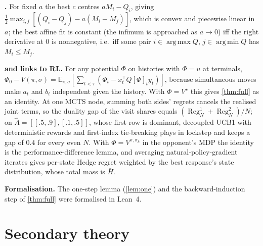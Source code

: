 \documentclass[10pt]{article}
\theoremstyle{plain}
\theoremstyle{definition}
\theoremstyle{remark}
\newcommand{\E}{\mathbb{E}}
\newcommand{\Hbar}{\bar H}
\newcommand{\Ahat}{\hat A}
\newcommand{\Vstar}{V^\star}
\DeclareMathOperator{\Reg}{Reg}
\DeclareMathOperator*{\argmin}{arg\,min}
\DeclareMathOperator*{\argmax}{arg\,max}
\begin{document}
\textbf{.} For fixed $a$ the best $c$ centres $aM_i-Q_i$, giving $\frac12\max_{i,j}[(Q_i-Q_j)-a(M_i-M_j)]$, which is convex and piecewise linear in $a$; the best affine fit is constant (the infimum is approached as $a\to0$) iff the right derivative at 0 is nonnegative, i.e.\ iff some pair $i\in\argmax Q$, $j\in\argmin Q$ has $M_i\le M_j$.

\textbf{ and links to RL.} For any potential $\Phi$ on histories with $\Phi=u$ at terminals, $\Phi_0-V(\pi,\sigma)=\E_{\pi,\sigma}[\sum_{t<\tau}(\Phi_t-x_t^\top Q[\Phi]_ty_t)]$, because simultaneous moves make $a_t$ and $b_t$ independent given the history. With $\Phi=\Vstar$ this gives \cref{thm:full} as an identity. At one MCTS node, summing both sides' regrets cancels the realised joint terms, so the duality gap of the visit shares equals $(\Reg^1_N+\Reg^2_N)/N$; on $\Ahat=[[.5,.9],[.1,.5]]$, whose first row is dominant, decoupled UCB1 with deterministic rewards and first-index tie-breaking plays in lockstep and keeps a gap of $0.4$ for every even $N$. With $\Phi=V^{\pi,\sigma_k}$ in the opponent's MDP the identity is the performance-difference lemma, and averaging natural-policy-gradient iterates gives per-state Hedge regret weighted by the best response's state distribution, whose total mass is $\Hbar$.

\textbf{Formalisation.} The one-step lemma (\cref{lem:one}) and the backward-induction step of \cref{thm:full} were formalised in Lean~4.

\section{Secondary theory}
\label{app:secondary}
\end{document}
